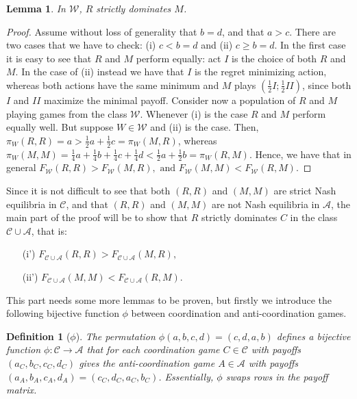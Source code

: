 \documentclass[fleqn,reqno,12pt]{article}
\theoremstyle{Satz}
\newtheorem{lemma}[theorem]{Lemma}
\newtheorem{definition}[theorem]{Definition}
\theoremstyle{Bsp}
\begin{document}
\begin{lemma} \label{lemma:W games} In $\mathcal{W}$, $R$ strictly dominates $M$.
\end{lemma}

\begin{proof}
  Assume without loss of generality that $b=d$, and that $ a>c $. There are two cases that we have to check:
  (i) $c < b=d$ and (ii) $c \geq b=d$. In the first case it is easy to see that $R$ and $M$
  perform equally: act $I$ is the choice of both $R$ and $M$. In the case of (ii) instead we have that $I$ is the regret minimizing action, whereas both actions have the same minimum and $M$ plays $(\frac{1}{2}I;\frac{1}{2}II)$, since both $I$ and
  $II$ maximize the minimal payoff. Consider now a population of $R$ and $M$ playing games from
  the class $\mathcal{W}$.  Whenever (i) is the case $R$ and $M$ perform equally well. But suppose $W \in \mathcal{W}$ and (ii) is the case. Then,
  $\pi_W(R,R)=a>\frac{1}{2}a+\frac{1}{2}c=\pi_W(M,R)$, whereas
  $\pi_W(M,M)=\frac{1}{4}a+\frac{1}{4}b+\frac{1}{4}c+\frac{1}{4}d<\frac{1}{2}a+\frac{1}{2}b=\pi_W(R,M)$.
  Hence, we have that in general
  $F_{\mathcal{W}}(R,R)>F_{\mathcal{W}}(M,R),\mbox{ and
  }F_{\mathcal{W}}(M,M)<F_{\mathcal{W}}(R,M)$.
\end{proof}

\noindent Since it is not difficult to see that both $(R,R)$ and $(M,M)$ are strict Nash equilibria in
$\mathcal{C}$, and that $(R,R)$ and $(M,M)$ are not Nash equilibria in $\mathcal{A}$, the main
part of the proof will be to show that $R$ strictly dominates $C$ in the class
$\mathcal{C}\cup\mathcal{A}$, that is:
\begin{multicols}{2}
  \begin{itemize}
  \item[(i')] $F_{\mathcal{C}\cup\mathcal{A}}(R,R)>F_{\mathcal{C}\cup\mathcal{A}}(M,R),$
  \item[(ii')] $F_{\mathcal{C}\cup\mathcal{A}}(M,M)<F_{\mathcal{C}\cup\mathcal{A}}(R,M).$
  \end{itemize}
\end{multicols}

\noindent This part needs some more lemmas to be proven, but firstly we introduce
the following bijective function $\phi$ between coordination and
anti-coordination games.

\begin{definition}[$\phi$] \label{def:bijection phi} The permutation $\phi(a,b,c,d)=(c,d,a,b)$
  defines a bijective function $\phi:\mathcal{C}\rightarrow\mathcal{A}$ that for each
  coordination game $C\in\mathcal{C}$ with payoffs $(a_{C},b_{C},c_{C},d_{C})$ gives the
  anti-coordination game $A\in\mathcal{A}$ with payoffs
  $(a_{A},b_{A},c_{A},d_{A})=(c_{C},d_{C},a_{C},b_{C})$. Essentially, $\phi$ swaps rows
  in the payoff matrix.
\end{definition}
\end{document}
